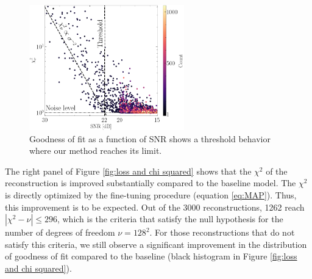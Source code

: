 \begin{figure}[th!]
        \centering
        \includegraphics[width=0.6\textwidth]{figures/chisq_vs_noise_ewc}
        \caption{Goodness of fit as a function of SNR shows a threshold 
        behavior where our method reaches its limit.}
        \label{fig:chi squared vs noise}
\end{figure}

The right panel of Figure \ref{fig:loss and chi squared} shows that 
the $\chi^2$ of the reconstruction is improved substantially compared to the 
baseline model. The $\chi^2$ is directly optimized by the fine-tuning procedure 
(equation \eqref{eq:MAP}). Thus, this improvement is to be expected. 
Out of the 
3000 reconstructions, 1262 reach $|\chi^2 - \nu| \leq 296$, which is the criteria 
that satisfy the null hypothesis for the number of degrees of freedom 
$\nu=128^{2}$. For those reconstructions that do not satisfy this criteria, 
we still observe a significant improvement in the distribution of goodness of fit 
compared to the baseline (black histogram in Figure \ref{fig:loss and chi squared}).





